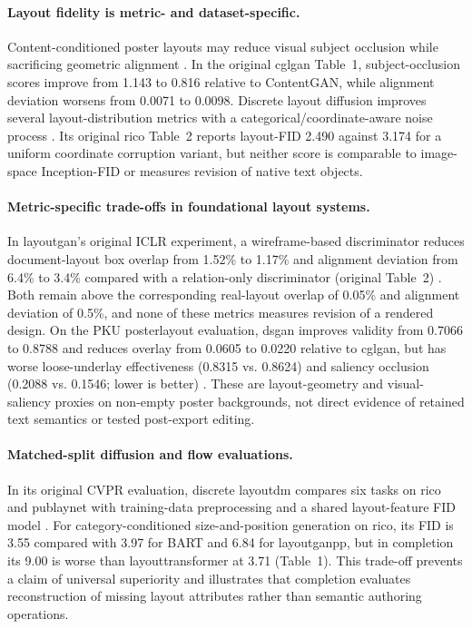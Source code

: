 \paragraph{Layout fidelity is metric- and dataset-specific.}
Content-conditioned poster layouts may reduce visual subject occlusion while sacrificing geometric alignment \citep{cglgan2022}.
In the original \ac{cglgan} Table~1, subject-occlusion scores improve from 1.143 to 0.816 relative to ContentGAN, while alignment deviation worsens from 0.0071 to 0.0098.
Discrete layout diffusion improves several layout-distribution metrics with a categorical/coordinate-aware noise process \citep{layoutdiffusion2023}.
Its original \ac{rico} Table~2 reports layout-FID 2.490 against 3.174 for a uniform coordinate corruption variant, but neither score is comparable to image-space Inception-FID or measures revision of native text objects.

\paragraph{Metric-specific trade-offs in foundational layout systems.}
In \ac{layoutgan}'s original ICLR experiment, a wireframe-based discriminator reduces document-layout box overlap from 1.52\% to 1.17\% and alignment deviation from 6.4\% to 3.4\% compared with a relation-only discriminator (original Table~2) \citep{layoutgan2019}.
Both remain above the corresponding real-layout overlap of 0.05\% and alignment deviation of 0.5\%, and none of these metrics measures revision of a rendered design.
On the PKU \ac{posterlayout} evaluation, \ac{dsgan} improves validity from 0.7066 to 0.8788 and reduces overlay from 0.0605 to 0.0220 relative to \ac{cglgan}, but has worse loose-underlay effectiveness (0.8315 vs. 0.8624) and saliency occlusion (0.2088 vs. 0.1546; lower is better) \citep{posterlayout2023}.
These are layout-geometry and visual-saliency proxies on non-empty poster backgrounds, not direct evidence of retained text semantics or tested post-export editing.

\paragraph{Matched-split diffusion and flow evaluations.}
In its original CVPR evaluation, discrete \ac{layoutdm} compares six tasks on \ac{rico} and \ac{publaynet} with training-data preprocessing and a shared layout-feature FID model \citep{layoutdm2023}.
For category-conditioned size-and-position generation on \ac{rico}, its FID is 3.55 compared with 3.97 for BART and 6.84 for \ac{layoutganpp}, but in completion its 9.00 is worse than \ac{layouttransformer} at 3.71 (Table~1).
This trade-off prevents a claim of universal superiority and illustrates that completion evaluates reconstruction of missing layout attributes rather than semantic authoring operations.

